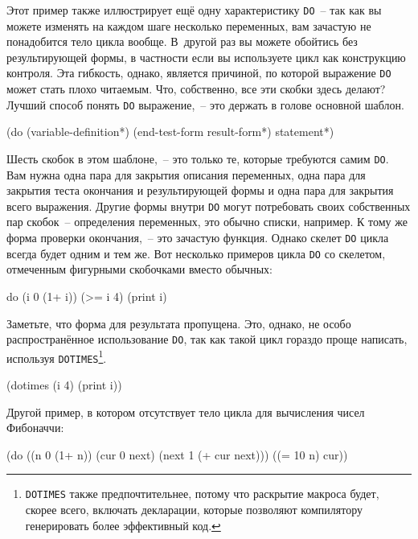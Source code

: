 Этот пример также иллюстрирует ещё одну характеристику \lstinline{DO}~-- так как вы можете
изменять на каждом шаге несколько переменных, вам зачастую не понадобится тело цикла
вообще. В~другой раз вы можете обойтись без результирующей формы, в частности если вы
используете цикл как конструкцию контроля. Эта гибкость, однако, является причиной, по
которой выражение \lstinline{DO} может стать плохо читаемым. Что, собственно, все эти скобки
здесь делают? Лучший способ понять \lstinline{DO} выражение,~-- это держать в голове основной
шаблон.

\begin{myverb}
(do (variable-definition*)
    (end-test-form result-form*)
  statement*)
\end{myverb}

Шесть скобок в этом шаблоне,~-- это только те, которые требуются самим \lstinline{DO}. Вам нужна
одна пара для закрытия описания переменных, одна пара для закрытия теста окончания и
результирующей формы и одна пара для закрытия всего выражения. Другие формы внутри
\lstinline{DO} могут потребовать своих собственных пар скобок~-- определения переменных, это
обычно списки, например. К тому же форма проверки окончания,~-- это зачастую функция. Однако
скелет \lstinline{DO} цикла всегда будет одним и тем же. Вот несколько примеров цикла \lstinline{DO}
со скелетом, отмеченным фигурными скобочками вместо обычных:

\begin{myverb}
{do {(i 0 (1+ i))}
    {(>= i 4)}
  (print i)}
\end{myverb}

Заметьте, что форма для результата пропущена. Это, однако, не особо распространённое
использование \lstinline{DO}, так как такой цикл гораздо проще написать, используя
\lstinline{DOTIMES}\footnote{\lstinline{DOTIMES} также предпочтительнее, потому что раскрытие
  макроса будет, скорее всего, включать декларации, которые позволяют компилятору
  генерировать более эффективный код.}.

\begin{myverb}
(dotimes (i 4) (print i))
\end{myverb}

Другой пример, в котором отсутствует тело цикла для вычисления чисел Фибоначчи:

\begin{myverb}
(do ((n 0 (1+ n))
     (cur 0 next)
     (next 1 (+ cur next)))
    ((= 10 n) cur))
\end{myverb}

